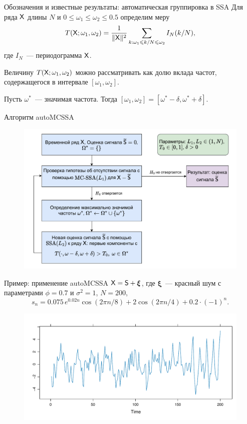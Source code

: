 \documentclass[notheorems, handout]{beamer}
\begin{document}
\begin{frame}{Обозначения и известные результаты: автоматическая группировка в SSA}
	Для ряда $\mathsf{X}$ длины $N$ и $0\leqslant\omega_1\leqslant\omega_2\leqslant0.5$ определим меру
	$$
	T(\mathsf{X}; \omega_1,\omega_2)=\frac{1}{\|\mathsf{X}\|^2}\sum_{k:\omega_1\leqslant k / N \leqslant \omega_2}I_N(k / N),
	$$
	где $I_N$~--- периодограмма $\mathsf{X}$. \medskip
	
	Величину $T(\mathsf{X}; \omega_1, \omega_2)$ можно рассматривать как долю вклада частот, содержащегося в интервале $[\omega_1, \omega_2]$.\bigskip

	Пусть $\omega^*$~--- значимая частота. Тогда $[\omega_1, \omega_2]=[\omega^*-\delta, \omega^* + \delta]$.
\end{frame}

\begin{frame}{Алгоритм autoMCSSA}
	\begin{figure}
		\centering
		\includegraphics[width=\textwidth]{img/auto_mcssa_alg.pdf}
	\end{figure}
\end{frame}

\begin{frame}{Пример: применение autoMCSSA}
	$\mathsf{X}=\mathsf{S}+\boldsymbol{\xi}$, где $\boldsymbol{\xi}$~--- красный шум с параметрами $\phi=0.7$ и $\sigma^2=1$, $N=200$,
	$$
	s_n=0.075\,e^{0.02n}\cos(2\pi n / 8) + 2\cos(2\pi n / 4) + 0.2\cdot (-1)^n.
	$$\vspace{-2.5em}
	\begin{figure}
		\centering
		\includegraphics[width=\textwidth]{img/noise_ts.pdf}
	\end{figure}
\end{frame}
\end{document}
